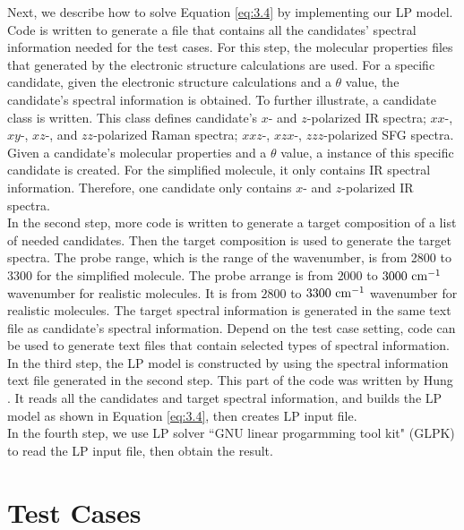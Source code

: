Next, we describe how to solve Equation \ref{eq:3.4} by implementing our LP model. Code is written to generate a file that contains all the candidates' spectral information needed for the test cases. For this step, the molecular properties files that generated by the electronic structure calculations are used. For a specific candidate, given the electronic structure calculations and a $\theta$ value, the candidate's spectral information is obtained. To further illustrate, a candidate class is written. This class defines candidate's $x$- and $z$-polarized IR spectra; $xx$-, $xy$-, $xz$-, and $zz$-polarized Raman spectra; $xxz$-, $xzx$-, $zzz$-polarized SFG spectra. Given a candidate's molecular properties and a $\theta$ value, a instance of this specific candidate is created. For the simplified molecule, it only contains IR spectral information. Therefore, one candidate only contains $x$- and $z$-polarized IR spectra. \\

In the second step, more code is written to generate a target composition of a list of needed candidates. Then the target composition is used to generate the target spectra. The probe range, which is the range of the wavenumber, is from 2800 to 3300 for the                    simplified molecule. The probe arrange is from $2000$ to $3000~\rm cm^{-1}$ wavenumber for realistic molecules. It is from $2800$ to $3300~\rm cm^{-1}$ wavenumber for realistic molecules. The target spectral information is generated in the same text file as candidate's spectral information. Depend on the test case setting, code can be used to generate text files that contain selected types of spectral information. \\

In the third step, the LP model is constructed by using the spectral information text file generated in the second step. This part of the code was written by Hung \cite{KuoKaiHung:Thesis:2015}. It reads all the candidates and target spectral information, and builds the LP model as shown in Equation \ref{eq:3.4}, then creates LP input file. \\

In the fourth step, we use LP solver ``GNU linear progarmming tool kit" (GLPK) to read the LP input file, then obtain the result. \\

\section{Test Cases}

